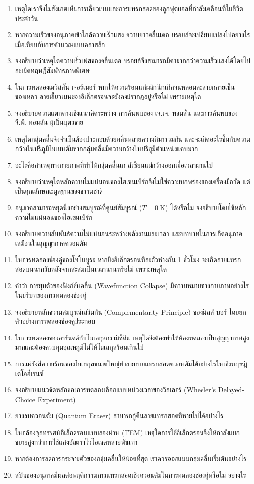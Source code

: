 \begin{enumerate}
    \item เหตุใดเราจึงไม่สังเกตเห็นการเลี้ยวเบนและการแทรกสอดของลูกฟุตบอลที่กำลังเคลื่อนที่ในชีวิตประจำวัน
    \item หากความเร็วของอนุภาคเข้าใกล้ความเร็วแสง ความยาวคลื่นเดอ บรอยล์จะเปลี่ยนแปลงไปอย่างไรเมื่อเทียบกับการคำนวณแบบคลาสสิก
    \item จงอธิบายว่าเหตุใดความเร็วเฟสของคลื่นเดอ บรอยล์จึงสามารถมีค่ามากกว่าความเร็วแสงได้โดยไม่ละเมิดทฤษฎีสัมพัทธภาพพิเศษ
    \item ในการทดลองเดวิสสัน-เจอร์เมอร์ หากให้ความร้อนแก่ผลึกนิกเกิลจนหลอมละลายกลายเป็นของเหลว ลายเลี้ยวเบนของอิเล็กตรอนจะยังคงปรากฏอยู่หรือไม่ เพราะเหตุใด
    \item จงอธิบายความแตกต่างเชิงแนวคิดระหว่าง การค้นพบของ เจ.เจ. ทอมสัน และการค้นพบของ จี.พี. ทอมสัน ผู้เป็นบุตรชาย
    \item เหตุใดกลุ่มคลื่นจึงจำเป็นต้องประกอบด้วยคลื่นหลายความถี่มารวมกัน และจะเกิดอะไรขึ้นกับความกว้างในปริภูมิโมเมนตัมหากกลุ่มคลื่นมีความกว้างในปริภูมิตำแหน่งแคบมาก
    \item อะไรคือสาเหตุทางกายภาพที่ทำให้กลุ่มคลื่นเกาส์เซียนแผ่กว้างออกเมื่อเวลาผ่านไป
    \item จงอธิบายว่าเหตุใดหลักความไม่แน่นอนของไฮเซนเบิร์กจึงไม่ใช่ความบกพร่องของเครื่องมือวัด แต่เป็นคุณลักษณะมูลฐานของธรรมชาติ
    \item อนุภาคสามารถหยุดนิ่งอย่างสมบูรณ์ที่ศูนย์สัมบูรณ์ ($T = 0~\text{K}$) ได้หรือไม่ จงอธิบายโดยใช้หลักความไม่แน่นอนของไฮเซนเบิร์ก
    \item จงอธิบายความสัมพันธ์ความไม่แน่นอนระหว่างพลังงานและเวลา และบทบาทในการเกิดอนุภาคเสมือนในสุญญากาศควอนตัม
    \item ในการทดลองช่องคู่ของโทโนมูระ หากยิงอิเล็กตรอนทีละตัวห่างกัน 1 ชั่วโมง จะเกิดลายแทรกสอดบนฉากรับหลังจากสะสมเป็นเวลานานหรือไม่ เพราะเหตุใด
    \item คำว่า การยุบตัวของฟังก์ชันคลื่น (Wavefunction Collapse) มีความหมายทางกายภาพอย่างไรในบริบทของการทดลองช่องคู่
    \item จงอธิบายหลักความสมบูรณ์เสริมกัน (Complementarity Principle) ของนีลส์ บอร์ โดยยกตัวอย่างการทดลองช่องคู่ประกอบ
    \item ในการทดลองของอาร์นดต์กับโมเลกุลกรามิซิดิน เหตุใดจึงต้องทำให้ห้องทดลองเป็นสุญญากาศสูงมากและต้องควบคุมอุณหภูมิไม่ให้โมเลกุลร้อนเกินไป
    \item การแผ่รังสีความร้อนของโมเลกุลขนาดใหญ่ทำลายลายแทรกสอดควอนตัมได้อย่างไรในเชิงทฤษฎีเดโคฮีเรนซ์
    \item จงอธิบายแนวคิดหลักของการทดลองเลือกแบบหน่วงเวลาของวีลเลอร์ (Wheeler's Delayed-Choice Experiment)
    \item ยางลบควอนตัม (Quantum Eraser) สามารถกู้คืนลายแทรกสอดที่หายไปได้อย่างไร
    \item ในกล้องจุลทรรศน์อิเล็กตรอนแบบส่องผ่าน (TEM) เหตุใดการใช้อิเล็กตรอนจึงให้กำลังแยกขยายสูงกว่าการใช้แสงอัลตราไวโอเลตหลายพันเท่า
    \item หากต้องการลดการกระจายตัวของกลุ่มคลื่นให้น้อยที่สุด เราควรออกแบบกลุ่มคลื่นเริ่มต้นอย่างไร
    \item สปินของอนุภาคมีผลต่อพฤติกรรมการแทรกสอดเชิงควอนตัมในการทดลองช่องคู่หรือไม่ อย่างไร
\end{enumerate}

